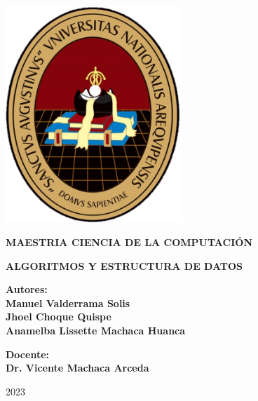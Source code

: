 \begin{titlepage}
   \begin{center}
       \vspace*{1cm}
      \includegraphics[width=0.5\textwidth]{images/Escudo_UNSA.png}\\
       \vspace{1.5cm}

        \Large
        \textbf{MAESTRIA CIENCIA DE LA COMPUTACIÓN}
    
        \Huge
        \textbf{ALGORITMOS Y ESTRUCTURA DE DATOS}

       \Large
 
       \vspace{1cm}
       \textbf{Autores:\\Manuel Valderrama Solis\\ Jhoel Choque Quispe\\ Anamelba Lissette Machaca Huanca}
              \vspace{1cm}

    \vspace{1cm}
       \textbf{Docente: \\ Dr. Vicente Machaca Arceda}
       
       
       2023
            
   \end{center}
\end{titlepage}